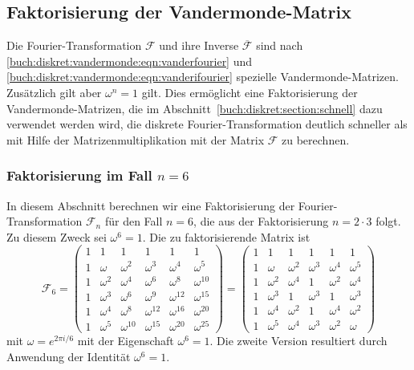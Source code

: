 %
%

%
%
%
\subsection{Faktorisierung der Vandermonde-Matrix
\label{buch:diskret:subsetion:faktorisierung}}
Die Fourier-Transformation $\mathscr{F}$ und ihre Inverse
$\overline{\mathscr{F}}$ sind nach
\eqref{buch:diskret:vandermonde:eqn:vanderfourier}
und
\eqref{buch:diskret:vandermonde:eqn:vanderifourier}
spezielle Van\-der\-mon\-de-Matrizen.
Zusätzlich gilt aber $\omega^n=1$ gilt.
Dies ermöglicht eine Faktorisierung der Vandermonde-Matrizen, die
im Abschnitt~\ref{buch:diskret:section:schnell} dazu verwendet
werden wird, die diskrete Fourier-Transformation deutlich schneller
als mit Hilfe der Matrizenmultiplikation mit der Matrix $\mathscr{F}$
zu berechnen.

%
%
\subsubsection{Faktorisierung im Fall $n=6$}
In diesem Abschnitt berechnen wir eine Faktorisierung der
Fourier-Transformation $\mathscr{F}_n$ für den Fall $n=6$,
die aus der Faktorisierung $n=2\cdot 3$ folgt.
Zu diesem Zweck sei $\omega^6=1$.
Die zu faktorisierende Matrix ist
\[
\mathscr{F}_6
=
\begin{pmatrix}
1&       1&          1&          1&          1&          1\\
1&  \omega&   \omega^2&   \omega^3&   \omega^4&   \omega^5\\
1&\omega^2&   \omega^4&   \omega^6&   \omega^8&\omega^{10}\\
1&\omega^3&   \omega^6&   \omega^9&\omega^{12}&\omega^{15}\\
1&\omega^4&   \omega^8&\omega^{12}&\omega^{16}&\omega^{20}\\
1&\omega^5&\omega^{10}&\omega^{15}&\omega^{20}&\omega^{25}
\end{pmatrix}
=
\begin{pmatrix}
1&       1&       1&       1&       1&       1\\
1&  \omega&\omega^2&\omega^3&\omega^4&\omega^5\\
1&\omega^2&\omega^4&       1&\omega^2&\omega^4\\
1&\omega^3&       1&\omega^3&       1&\omega^3\\
1&\omega^4&\omega^2&       1&\omega^4&\omega^2\\
1&\omega^5&\omega^4&\omega^3&\omega^2&\omega
\end{pmatrix}
\]
mit $\omega = e^{2\pi i/6}$ mit der Eigenschaft $\omega^6=1$.
Die zweite Version resultiert durch Anwendung der Identität $\omega^6=1$.

